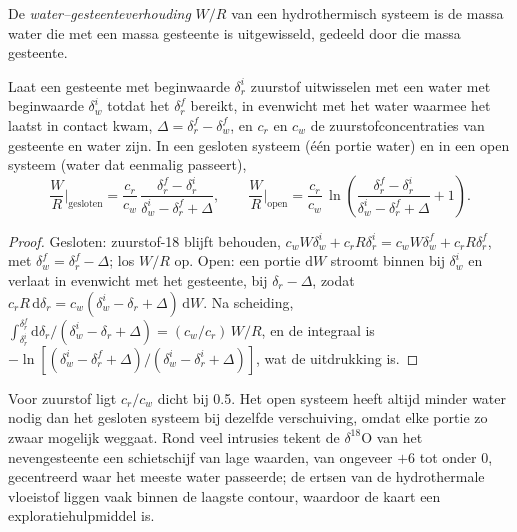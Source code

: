 \begin{definition}\label{def:b3:water-rock-interaction:water-rock-ratio}
De \emph{water--gesteenteverhouding} $W/R$ van een
hydrothermisch systeem is de massa water die met een massa gesteente is uitgewisseld,
gedeeld door die massa gesteente.
\end{definition}

\begin{proposition}\label{prop:b3:water-rock-interaction:wr}
Laat een gesteente met beginwaarde $\delta_r^i$ zuurstof uitwisselen met een water met
beginwaarde $\delta_w^i$ totdat het $\delta_r^f$ bereikt, in evenwicht met het water
waarmee het laatst in contact kwam, $\Delta = \delta_r^f - \delta_w^f$, en $c_r$ en $c_w$ de
zuurstofconcentraties van gesteente en water zijn. In een gesloten systeem (één
portie water) en in een open systeem (water dat eenmalig passeert),
\[
\frac WR\Big|_{\text{gesloten}} = \frac{c_r}{c_w}\,
\frac{\delta_r^f - \delta_r^i}{\delta_w^i - \delta_r^f + \Delta},
\qquad
\frac WR\Big|_{\text{open}} = \frac{c_r}{c_w}\,
\ln\!\left(\frac{\delta_r^f - \delta_r^i}{\delta_w^i - \delta_r^f + \Delta} + 1\right).
\]
\end{proposition}

\begin{proof}
Gesloten: zuurstof-18 blijft behouden, $c_wW\delta_w^i + c_rR\delta_r^i = c_wW
\delta_w^f + c_rR\delta_r^f$, met $\delta_w^f = \delta_r^f - \Delta$; los
$W/R$ op. Open: een portie $\mathrm dW$ stroomt binnen bij $\delta_w^i$ en verlaat
in evenwicht met het gesteente, bij $\delta_r - \Delta$, zodat $c_rR\,\mathrm d\delta_r
= c_w(\delta_w^i - \delta_r + \Delta)\,\mathrm dW$. Na scheiding,
$\int_{\delta_r^i}^{\delta_r^f}\mathrm d\delta_r/(\delta_w^i - \delta_r +
\Delta) = (c_w/c_r)\,W/R$, en de integraal is $-\ln[(\delta_w^i - \delta_r^f
+ \Delta)/(\delta_w^i - \delta_r^i + \Delta)]$, wat de uitdrukking is.
\end{proof}

Voor zuurstof ligt $c_r/c_w$ dicht bij 0.5. Het open systeem heeft altijd minder
water nodig dan het gesloten systeem bij dezelfde verschuiving, omdat elke portie
zo zwaar mogelijk weggaat. Rond veel intrusies tekent de $\delta^{18}\mathrm O$ van het
nevengesteente een schietschijf van lage waarden, van ongeveer $+6$ tot onder
0, gecentreerd waar het meeste water passeerde; de ertsen van de hydrothermale
vloeistof liggen vaak binnen de laagste contour, waardoor de kaart een
exploratiehulpmiddel is.

